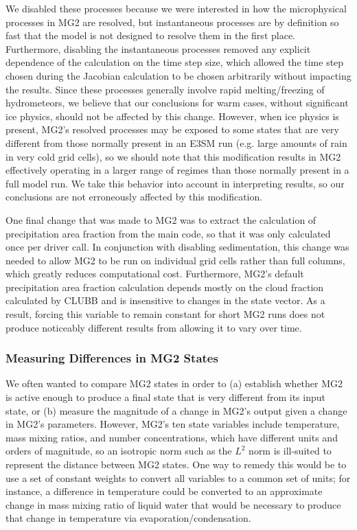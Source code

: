\documentclass [11pt, proquest] {uwthesis}[2020/02/24]
\begin{document}
We disabled these processes because we were interested in how the microphysical processes in MG2 are resolved, but instantaneous processes are by definition so fast that the model is not designed to resolve them in the first place. Furthermore, disabling the instantaneous processes removed any explicit dependence of the calculation on the time step size, which allowed the time step chosen during the Jacobian calculation to be chosen arbitrarily without impacting the results. Since these processes generally involve rapid melting/freezing of hydrometeors, we believe that our conclusions for warm cases, without significant ice physics, should not be affected by this change. However, when ice physics is present, MG2's resolved processes may be exposed to some states that are very different from those normally present in an E3SM run (e.g. large amounts of rain in very cold grid cells), so we should note that this modification results in MG2 effectively operating in a larger range of regimes than those normally present in a full model run. We take this behavior into account in interpreting results, so our conclusions are not erroneously affected by this modification.

One final change that was made to MG2 was to extract the calculation of precipitation area fraction from the main code, so that it was only calculated once per driver call. In conjunction with disabling sedimentation, this change was needed to allow MG2 to be run on individual grid cells rather than full columns, which greatly reduces computational cost. Furthermore, MG2's default precipitation area fraction calculation depends mostly on the cloud fraction calculated by CLUBB and is insensitive to changes in the state vector. As a result, forcing this variable to remain constant for short MG2 runs does not produce noticeably different results from allowing it to vary over time.

\subsubsection{Measuring Differences in MG2 States}

We often wanted to compare MG2 states in order to (a) establish whether MG2 is active enough to produce a final state that is very different from its input state, or (b) measure the magnitude of a change in MG2's output given a change in MG2's parameters. However, MG2's ten state variables include temperature, mass mixing ratios, and number concentrations, which have different units and orders of magnitude, so an isotropic norm such as the $L^2$ norm is ill-suited to represent the distance between MG2 states. One way to remedy this would be to use a set of constant weights to convert all variables to a common set of units; for instance, a difference in temperature could be converted to an approximate change in mass mixing ratio of liquid water that would be necessary to produce that change in temperature via evaporation/condensation.
\end{document}
